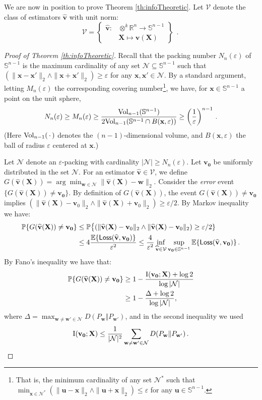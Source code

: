 \documentclass[11pt]{article}
\theoremstyle{definition}
\def\Loss{{\sf Loss}}
\def\cN{\mathcal N}
\def\prob{{\mathbb P}}
\def\E{{\mathbb E}} %
\def\reals{\mathbb{R}}
\def\bx{\mathbf{x}}
\def\bu{\mathbf{u}}
\def\bv{\mathbf{v}}
\def\hbv{\mathbf{\widehat{v}}}
\def\bw{\mathbf{w}}
\def\bvz{\mathbf{v_0}}
\def\bX{\mathbf{X}}
\def\cV{\mathcal{V}}
\def\bbS{\mathbb{S}}
\def\E{\mathbb{E}}
\def\eps{\varepsilon}
\begin{document}
We are now in position to prove Theorem \ref{th:infoTheoretic}.
  Let $\cV$ denote the class of estimators $\hbv$ with unit norm:
  \begin{equation} 
%
\cV = \left \{\begin{aligned} \hbv :& \otimes^k \reals^n \to
    \bbS^{n-1}\\ & \bX \mapsto \hbv(\bX) \end{aligned}\right \}~~.\
%
\end{equation}
%
\begin{proof}[Proof of Theorem \ref{th:infoTheoretic}]
Recall that the packing number
$N_n(\eps)$ of $\bbS^{n-1}$ is the maximum cardinality of any set
$\cN\subseteq \bbS^{n-1}$ such that $(\|\bx-\bx'\|_2\wedge\|\bx+\bx'\|_2)\ge \eps$ for any
$\bx,\bx'\in \cN$. By a standard argument, letting $M_n(\eps)$
the corresponding covering number\footnote{That is, the minimum
  cardinality of any set $\cN^*$ such that
  $\min_{\bx\in\cN^*}(\|\bu-\bx\|_2\wedge \|\bu+\bx\|_2 )\le\eps$ for any
  $\bu\in\bbS^{n-1}$.},  we have, for $\bx\in \bbS^{n-1}$ a point on the
unit sphere,
%
\begin{align}
%
N_n(\eps)\ge M_n(\eps)\ge \frac{{\rm Vol}_{n-1}(\bbS^{n-1})}{2{\rm
    Vol}_{n-1}(\bbS^{n-1}\cap B(\bx,\eps))} \ge
\left(\frac{1}{\eps}\right)^{n-1}\, .\label{eq:BoundPacking}
%  
\end{align}
%
(Here ${\rm Vol}_{n-1}(\,\cdot\,)$ denotes the $(n-1)$-dimensional volume,
and $B(\bx,\eps)$ the ball of radius $\eps$ centered at $\bx$.)


  Let $\cN$ denote an $\eps$-packing with cardinality $|\cN|\ge
  N_n(\eps)$. 
Let $\bvz$ be uniformly distributed  in the set $\cN$. For an estimator $\hbv \in\cV$, we define
  $G(\hbv(\bX)) = \arg\min_{\bw\in\cN} \| \hbv(\bX) - \bw\|_2$. Consider the {\em error} event $\{ G(\hbv(\bX)) \ne \bvz\}$.
  By definition of $G(\hbv(\bX))$, the event $G(\hbv(\bX))\ne \bvz$
  implies $(\| \hbv(\bX) - \bv_0\|_2\wedge \|\hbv(\bX) + \bv_0\|_2) \ge \eps/2$.
 By Markov inequality we have:
%
\begin{align}
%
    \prob \{ G(\hbv(\bX)) \ne \bvz\} &\le \prob\big\{(\|\hbv(\bX) -
    \bv_0\|_2\wedge \|\hbv(\bX) -
    \bv_0\|_2) \ge \eps/2\} \nonumber \\
    &\le 4\frac{\E\{\Loss(\hbv,\bvz)\}}{\eps^2}\le \frac{4
      }{\eps^2} \inf_{\hbv\in\cV}\sup_{\bvz \in
        \bbS^{n-1}}\E\{\Loss(\hbv, \bvz)\}\, .\label{eq:Perrbound}
%
  \end{align}
  By Fano's inequality \cite{cover2012elements} we have that:
%
  \begin{align}\label{eq:FanoIneq}
    \prob\{G(\hbv(\bX)) \ne \bvz\} &\ge 1-\frac{{\rm I}(\bvz;\bX)+\log 2}{\log|\cN|}\\
&\ge 1 - \frac{\Delta + \log 2}{\log{|\cN|}}, 
  \end{align}
%
  where $\Delta = \max_{\bw\ne \bw'\in\cN}D(P_\bw \Vert P_{\bw'})$, and in
  the second inequality we used \cite{han1994generalizing}
%
\begin{align}
%
{\rm I}(\bvz;\bX) \le \frac{1}{|\cN|^2}\sum_{\bw\ne
    \bw'\in\cN}D(P_\bw \Vert P_{\bw'})\,.
%
\end{align}



\end{proof}
\end{document}
